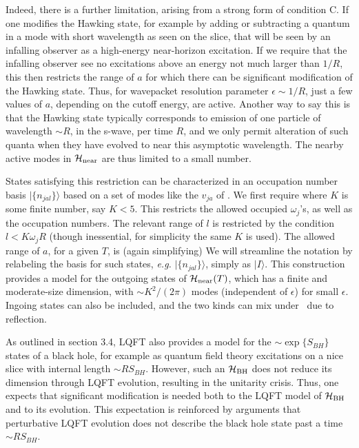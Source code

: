 Indeed, there is a further limitation, arising from a strong form of condition C.  If one modifies the Hawking state, for example by adding or subtracting a quantum in a mode with short wavelength as seen on the slice, that will be seen by an infalling observer as a high-energy near-horizon excitation.   If we require that the infalling observer see no excitations above an energy not much larger than $1/R$, this then restricts the range of $a$ for which there can be significant modification of the Hawking state.  Thus, for wavepacket resolution parameter $\epsilon\sim 1/R$, just a few values of $a$, depending on the cutoff energy, are active.  Another way to say this is that the Hawking state typically corresponds to emission of one particle of wavelength $\sim R$, in the s-wave, per time $R$, and we only permit alteration of such quanta when they have evolved  to near this asymptotic wavelength.  The nearby active modes in ${{\cal H}_{\rm near}}$ are thus limited to a small number.

States satisfying this restriction can  be characterized in an occupation number basis $|\{n_{jal}\}\rangle$ based on a set of modes like the ${v}_{ja}$ of \vki.  We first require
%
\eqn{}
%
where $K$ is some finite number, say $K<5$.  This restricts the allowed occupied $\omega_j$'s, as well as the occupation numbers.  The relevant range of $l$ is restricted by the condition $l<K \omega_j R$ (though inessential, for simplicity the same $K$ is used).  The allowed range of $a$, for a given $T$, is (again simplifying)
%
\eqn{}
%
We will streamline the notation by relabeling the basis for such states, {\it e.g.} $|\{n_{jal}\}\rangle$, simply as  $|I\rangle$.
  This construction provides a model for the outgoing states of ${{\cal H}_{\rm near}}(T)$, which has a finite and moderate-size dimension, with  $\sim K^2/(2\pi)$ modes (independent of $\epsilon$) for small $\epsilon$.  Ingoing states can also be included, and the two kinds can mix under \unitop\ due to reflection.

\subsubsec{$\hbh$}

As outlined in section 3.4, LQFT also provides a model for the $\sim\exp\{S_{BH}\}$ states of a black hole, for example as quantum field theory excitations on a nice slice with internal length $\sim R S_{BH}$.  However, such an $\hbh$ does not reduce its dimension through LQFT evolution, resulting in the unitarity crisis.  Thus, one expects that significant modification is needed both to the LQFT model of $\hbh$ and to its evolution.  This expectation is reinforced by arguments that perturbative LQFT evolution does not describe the black hole state past a time $\sim R S_{BH}$.  


